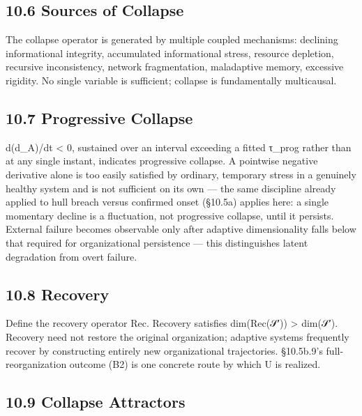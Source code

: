 \documentclass[
]{article}
\begin{document}
\hypertarget{sources-of-collapse}{%
\subsection{10.6 Sources of Collapse}\label{sources-of-collapse}}

The collapse operator is generated by multiple coupled mechanisms:
declining informational integrity, accumulated informational stress,
resource depletion, recursive inconsistency, network fragmentation,
maladaptive memory, excessive rigidity. No single variable is
sufficient; collapse is fundamentally multicausal.

\hypertarget{progressive-collapse}{%
\subsection{10.7 Progressive Collapse}\label{progressive-collapse}}

d(d\_A)/dt \textless{} 0, sustained over an interval exceeding a fitted
τ\_prog rather than at any single instant, indicates progressive
collapse. A pointwise negative derivative alone is too easily satisfied
by ordinary, temporary stress in a genuinely healthy system and is not
sufficient on its own --- the same discipline already applied to hull
breach versus confirmed onset (§10.5a) applies here: a single momentary
decline is a fluctuation, not progressive collapse, until it persists.
External failure becomes observable only after adaptive dimensionality
falls below that required for organizational persistence --- this
distinguishes latent degradation from overt failure.

\hypertarget{recovery}{%
\subsection{10.8 Recovery}\label{recovery}}

Define the recovery operator Rec. Recovery satisfies dim(Rec(𝒮′))
\textgreater{} dim(𝒮′). Recovery need not restore the original
organization; adaptive systems frequently recover by constructing
entirely new organizational trajectories. §10.5b.9's full-reorganization
outcome (B2) is one concrete route by which U is realized.

\hypertarget{collapse-attractors}{%
\subsection{10.9 Collapse Attractors}\label{collapse-attractors}}
\end{document}
